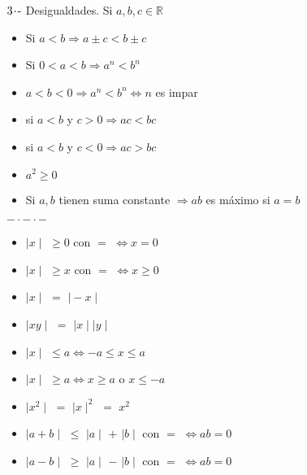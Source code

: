 $3\hspace{-0.05cm}\cdot\hspace{-0.05cm}\text{-}$ Desigualdades. Si $a,b,c \in \mathbb{R}$
\begin{itemize}
    \def\labelitemi{-}
    \addtolength{\itemindent}{0.5cm}
    \item Si $a<b \Longrightarrow a \pm c < b\pm c$
    \item Si $0 < a < b \Longrightarrow a^n < b^n$
    \item $a < b < 0 \Longrightarrow a^n < b^n \Longleftrightarrow n$ es impar
    \item si $a < b$ y $c > 0 \Longrightarrow ac < bc$
    \item si $a < b$ y $c < 0 \Longrightarrow ac > bc$
    \item $a^2 \ge 0$
    \item Si $a,b$ tienen suma constante $\Longrightarrow ab$ es máximo si $a=b$ 
\end{itemize}
\begin{center}
    \texttt{$-\cdot-\cdot-$}
\end{center}
\begin{itemize}
    \def\labelitemi{-}
    \addtolength{\itemindent}{0.5cm}
    \item $\mid x \mid$ $\ge 0$ con $=$ $\Longleftrightarrow x = 0$
    \item $\mid x \mid$ $\ge x$ con $=$ $\Longleftrightarrow x \ge 0$
    \item $\mid x \mid$ $=$ $\mid -x \mid$
    \item $\mid xy \mid$ $=$ $\mid x \mid\mid y \mid$
    \item $\mid x \mid$ $\le a \Longleftrightarrow -a \le x \le a$
    \item $\mid x \mid$ $\ge a \Longleftrightarrow x \ge a$ o $x \le -a$
    \item $\mid x^2 \mid$ $=$ $\mid x \mid^2$ $=$ $x^2$
    \item $\mid a+b \mid$ $\le$ $\mid a \mid$ $+$ $\mid b \mid$ con $=$ $ \Longleftrightarrow ab = 0$
    \item $\mid a-b \mid$ $\ge$ $\mid a \mid$ $-$ $\mid b \mid$ con $=$ $ \Longleftrightarrow ab = 0$
\end{itemize}

\vspace{0.5cm}

